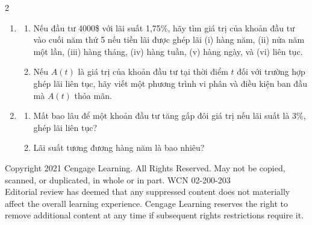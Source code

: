 \begin{paracol}{2}
\begin{enumerate}[label=\textbf{\arabic*.},leftmargin=*,itemsep=9pt,topsep=0pt,parsep=2pt]
  \item
    \begin{enumerate}[label=\textbf{(\alph*)},leftmargin=1.5em,itemsep=3pt,topsep=0pt]
      \item Nếu đầu tư 4000\$ với lãi suất 1,75\%, hãy tìm giá trị của khoản đầu tư vào cuối năm thứ 5 nếu tiền lãi được ghép lãi (i) hàng năm, (ii) nửa năm một lần, (iii) hàng tháng, (iv) hàng tuần, (v) hàng ngày, và (vi) liên tục.
      \item Nếu $A(t)$ là giá trị của khoản đầu tư tại thời điểm $t$ đối với trường hợp ghép lãi liên tục, hãy viết một phương trình vi phân và điều kiện ban đầu mà $A(t)$ thỏa mãn.
    \end{enumerate}

  \item
    \begin{enumerate}[label=\textbf{(\alph*)},leftmargin=1.5em,itemsep=2pt,topsep=0pt]
      \item Mất bao lâu để một khoản đầu tư tăng gấp đôi giá trị nếu lãi suất là 3\%, ghép lãi liên tục?
      \item Lãi suất tương đương hàng năm là bao nhiêu?
    \end{enumerate}
\end{enumerate}

\end{paracol}

\vfill
\begin{center}
  \fontsize{7pt}{8.5pt}\selectfont\color{gray!80}
  Copyright 2021 Cengage Learning. All Rights Reserved. May not be copied, scanned, or duplicated, in whole or in part. WCN 02-200-203\\
  Editorial review has deemed that any suppressed content does not materially affect the overall learning experience. Cengage Learning reserves the right to remove additional content at any time if subsequent rights restrictions require it.
\end{center}
